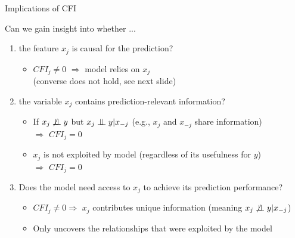 \documentclass[10pt,compress,t,notes=noshow, xcolor=table]{beamer}
\begin{document}
\begin{frame}{Implications of CFI}

Can we gain insight into whether ...

\begin{enumerate}
    \item<1-3> the feature $x_j$ is causal for the prediction?
    \begin{itemize}
      \item $CFI_j \neq 0$ $\Rightarrow$ model relies on $x_j$ \\(converse does not hold, see next slide)
    \end{itemize}
    \item<2-3> the variable $x_j$ contains prediction-relevant information?
    \begin{itemize}
      \item If $x_j \not \perp \!\!\! \perp y$ but $x_j \perp \!\!\! \perp y | x_{-j}$ (e.g., $x_j$ and $x_{-j}$ share information) \\$\Rightarrow$ $CFI_j = 0$
      \item  $x_{j}$ is not exploited by model (regardless of its usefulness for $y$) \\$\Rightarrow$ $CFI_j = 0$
    \end{itemize}
    \item<3> Does the model need access to $x_j$ to achieve its prediction performance?
\begin{itemize}
      \item $CFI_j \neq 0 \Rightarrow$ $x_j$ contributes unique information (meaning $x_j \not \perp \!\!\! \perp y | x_{-j}$)
      \item Only uncovers the relationships that were exploited by the model
    \end{itemize}
\end{enumerate}
\end{frame}
\end{document}
